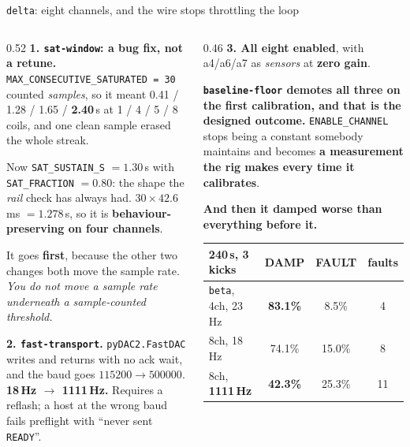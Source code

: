 \documentclass[aspectratio=169]{beamer}
\begin{document}
\begin{frame}{\texttt{delta}: eight channels, and the wire stops throttling the loop}
  \footnotesize
  \begin{columns}[T]
    \begin{column}{0.52\textwidth}
      \textbf{1. \texttt{sat-window}: a bug fix, not a retune.}
      \texttt{MAX\_CONSECUTIVE\_SATURATED = 30} counted \emph{samples}, so it
      meant 0.41 / 1.28 / 1.65 / \textbf{2.40}\,s at 1 / 4 / 5 / 8 coils, and
      one clean sample erased the whole streak.

      \vspace{1mm}
      Now \texttt{SAT\_SUSTAIN\_S} $= 1.30$\,s with \texttt{SAT\_FRACTION}
      $= 0.80$: the shape the \emph{rail} check has always had.
      $30 \times 42.6$\,ms $= \mathbf{1.278}$\,s, so it is
      \textbf{behaviour-preserving on four channels}.

      \vspace{1mm}
      It goes \textbf{first}, because the other two changes both move the sample
      rate. \emph{You do not move a sample rate underneath a sample-counted
      threshold.}

      \vspace{2mm}
      \textbf{2. \texttt{fast-transport}.} \texttt{pyDAC2.FastDAC} writes and
      returns with no ack wait, and the baud goes $115200 \to 500000$.
      \textbf{18\,Hz $\to$ 1111\,Hz.} Requires a reflash; a host at the
      wrong baud fails preflight with ``never sent \texttt{READY}''.
    \end{column}
    \begin{column}{0.46\textwidth}
      \textbf{3. All eight enabled}, with a4/a6/a7 as \emph{sensors} at
      \textbf{zero gain}.

      \vspace{1mm}
      \textbf{\texttt{baseline-floor} demotes all three on the first
      calibration, and that is the designed outcome.} \texttt{ENABLE\_CHANNEL}
      stops being a constant somebody maintains and becomes \textbf{a
      measurement the rig makes every time it calibrates}.

      \vspace{2mm}
      \textbf{And then it damped worse than everything before it.}

      \vspace{1mm}
      \centering
      {\scriptsize\setlength{\tabcolsep}{3.5pt}
      \begin{tabular}{@{}lccc@{}}
        \toprule
        240\,s, 3 kicks & DAMP & FAULT & faults \\
        \midrule
        \texttt{beta}, 4ch, 23\,Hz & \textbf{83.1\%} & 8.5\% & 4 \\
        8ch, 18\,Hz & 74.1\% & 15.0\% & 8 \\
        8ch, \textbf{1111\,Hz} & \textbf{42.3\%} & 25.3\% & 11 \\
        \bottomrule
      \end{tabular}}


\end{column}
\end{columns}
\end{frame}
\end{document}
